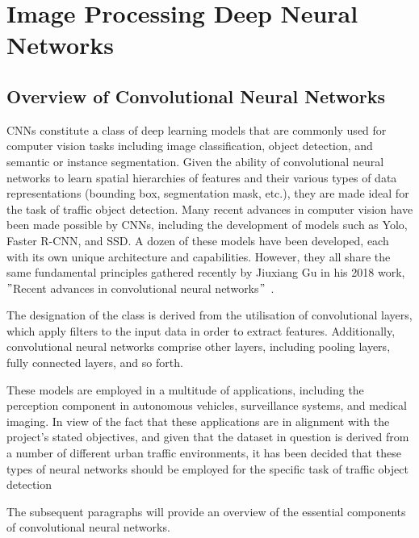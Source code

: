 \section{Image Processing Deep Neural Networks}\label{sec:image-processing-deep-neural-networks}

\subsection{Overview of Convolutional Neural Networks}\label{subsec:convolutional-neural-networks}

CNNs constitute a class of deep learning models that are commonly used for computer vision tasks
including image classification, object detection, and semantic or instance segmentation.
Given the ability of convolutional neural networks to learn spatial hierarchies of features and their various types of data representations
(bounding box, segmentation mask, etc.), they are made ideal for the task of traffic object detection.
Many recent advances  in computer vision have been made possible by CNNs, including the development of models such as Yolo, Faster R-CNN, and SSD.
A dozen of these models have been developed, each with its own unique architecture and capabilities.
However, they all share the same fundamental principles gathered recently by Jiuxiang Gu in his 2018 work,
\("\)Recent advances in convolutional neural networks\("\)~\cite{GU2018354}.

The designation of the class is derived from the utilisation of convolutional layers,
which apply filters to the input data in order to extract features.
Additionally, convolutional neural networks comprise other layers, including
pooling layers, fully connected layers, and so forth.

These models are employed in a multitude of applications, including the perception
component in autonomous vehicles, surveillance systems, and medical imaging.
In view of the fact that these applications are in alignment with the project's stated objectives,
and given that the dataset in question is derived from a number of different urban traffic
environments, it has been decided that these types of neural networks should be employed for the
specific task of traffic object detection

The subsequent paragraphs will provide an overview of the essential components of convolutional neural networks.

